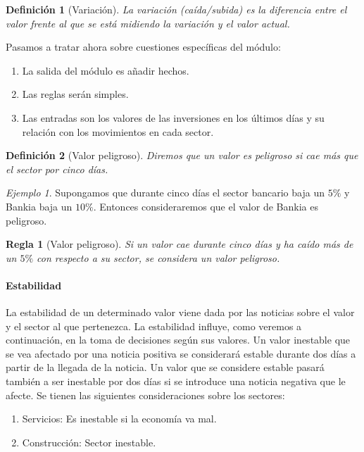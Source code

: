 \documentclass[11pt,leqno]{article}
\theoremstyle{definition_wo_parentheses}
\newtheorem{definicion}{Definición}[subsection]
\theoremstyle{plain}
\newtheorem{regla}{Regla}[subsection]
\theoremstyle{remark}
\newtheorem{ejemplo}{Ejemplo}[subsection]
\begin{document}
\begin{definicion}[Variación]
	La variación (caída/subida) es la diferencia entre el valor frente al que se está midiendo la variación y el valor actual.
\end{definicion} 

	Pasamos a tratar ahora sobre cuestiones específicas del módulo:
	
\begin{enumerate}
\item La salida del módulo es añadir hechos.
\item Las reglas serán simples.
\item Las entradas son los valores de las inversiones en los últimos días y su relación con los movimientos en cada sector.
\end{enumerate}

\begin{definicion}[Valor peligroso]
	Diremos que un valor es peligroso si cae más que el sector por cinco días.
\end{definicion}

\begin{ejemplo}
	Supongamos que durante cinco días el sector bancario baja un $5\%$ y Bankia baja un $10\%$. Entonces consideraremos que el valor de Bankia es peligroso.
\end{ejemplo}

\begin{regla}[Valor peligroso]
	Si un valor cae durante cinco días y ha caído más de un $5\%$ con respecto a su sector, se considera un valor peligroso.
\end{regla}

\paragraph{Estabilidad} La estabilidad de un determinado valor viene dada por las noticias sobre el valor y el sector al que pertenezca. La estabilidad influye, como veremos a continuación, en la toma de decisiones según sus valores. Un valor inestable que se vea afectado por una noticia positiva se considerará estable durante dos días a partir de la llegada de la noticia. Un valor que se considere estable pasará también a ser inestable por dos días si se introduce una noticia negativa que le afecte. Se tienen las siguientes consideraciones sobre los sectores:

\begin{enumerate}[a]
\item Servicios: Es inestable si la economía va mal.
\item Construcción: Sector inestable.
\end{enumerate}
\end{document}
